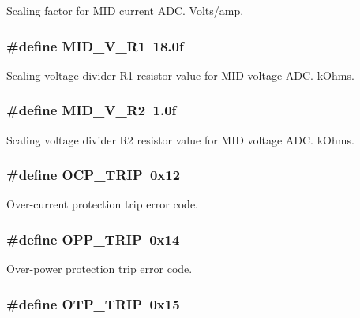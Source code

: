 Scaling factor for M\-I\-D current A\-D\-C. Volts/amp. \hypertarget{a00043_a08a0080c0df15f8f1aff560c95563e65}{
\subsubsection[{M\-I\-D\-\_\-\-V\-\_\-\-R1}]{\setlength{\rightskip}{0pt plus 5cm}\#define M\-I\-D\-\_\-\-V\-\_\-\-R1~18.\-0f}}\label{a00043_a08a0080c0df15f8f1aff560c95563e65}
Scaling voltage divider R1 resistor value for M\-I\-D voltage A\-D\-C. k\-Ohms. \hypertarget{a00043_a176ea315a270ecc6a601c5b0ce7203b5}{
\subsubsection[{M\-I\-D\-\_\-\-V\-\_\-\-R2}]{\setlength{\rightskip}{0pt plus 5cm}\#define M\-I\-D\-\_\-\-V\-\_\-\-R2~1.\-0f}}\label{a00043_a176ea315a270ecc6a601c5b0ce7203b5}
Scaling voltage divider R2 resistor value for M\-I\-D voltage A\-D\-C. k\-Ohms. \hypertarget{a00043_a42d97deed6614a0b5b0aee655055b43a}{
\subsubsection[{O\-C\-P\-\_\-\-T\-R\-I\-P}]{\setlength{\rightskip}{0pt plus 5cm}\#define O\-C\-P\-\_\-\-T\-R\-I\-P~0x12}}\label{a00043_a42d97deed6614a0b5b0aee655055b43a}
Over-\/current protection trip error code. \hypertarget{a00043_a7037d8fd93cf1a2ae591b639614c0338}{
\subsubsection[{O\-P\-P\-\_\-\-T\-R\-I\-P}]{\setlength{\rightskip}{0pt plus 5cm}\#define O\-P\-P\-\_\-\-T\-R\-I\-P~0x14}}\label{a00043_a7037d8fd93cf1a2ae591b639614c0338}
Over-\/power protection trip error code. \hypertarget{a00043_a5815c03ac63c324e326a148e247f24a1}{
\subsubsection[{O\-T\-P\-\_\-\-T\-R\-I\-P}]{\setlength{\rightskip}{0pt plus 5cm}\#define O\-T\-P\-\_\-\-T\-R\-I\-P~0x15}}\label{a00043_a5815c03ac63c324e326a148e247f24a1}
